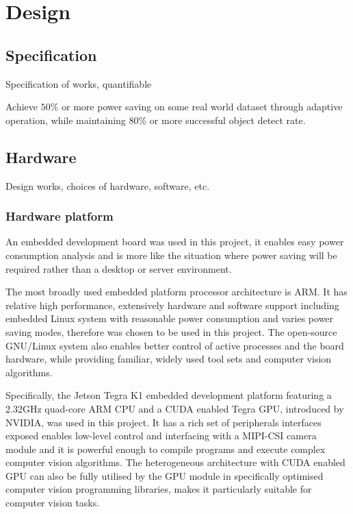 \chapter{Design} \label{Chapter:Design}

\section{Specification}

{\color{red}Specification of works, quantifiable}

Achieve $50\%$ or more power saving on some real world dataset through adaptive operation, while maintaining $80\%$ or more successful object detect rate.

\section{Hardware}

{\color{red}Design works, choices of hardware, software, etc.}

\subsection{Hardware platform}


An embedded development board was used in this project, it enables easy power consumption analysis and is more like the situation where power saving will be required rather than a desktop or server environment.

The most broadly used embedded platform processor architecture is ARM. It has relative high performance, extensively hardware and software support including embedded Linux system with reasonable power consumption and varies power saving modes, therefore was chosen to be used in this project. The open-source GNU/Linux system also enables better control of active processes and the board hardware, while providing familiar, widely used tool sets and computer vision algorithms.

Specifically, the Jetson Tegra K1 embedded development platform \cite{NVIDIA:tk1} featuring a 2.32GHz quad-core ARM CPU and a CUDA enabled Tegra GPU, introduced by NVIDIA, was used in this project. It has a rich set of peripherals interfaces exposed enables low-level control and interfacing with a MIPI-CSI camera module and it is powerful enough to compile programs and execute complex computer vision algorithms. The heterogeneous architecture with CUDA enabled GPU can also be fully utilised by the GPU module in specifically optimised computer vision programming libraries, makes it particularly suitable for computer vision tasks.

